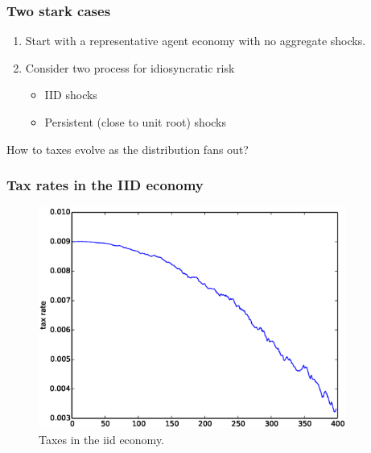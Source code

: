 \documentclass{beamer}
\begin{document}
\begin{frame}
 \frametitle{Two stark cases}
\begin{enumerate}
 \item Start with a representative agent economy with no aggregate shocks. 
\item 
 Consider two process for idiosyncratic risk
 
 \begin{itemize}
  \item IID shocks
  
  \item Persistent (close to unit root) shocks
 \end{itemize}

\end{enumerate}
 

How to taxes evolve as the distribution fans out?
 
\end{frame}

\begin{frame}
\frametitle {Tax rates in the IID economy}
  \begin{figure}[htp]
 \centering
 \includegraphics[width=0.9\textwidth]{Images/tax_iid.eps}
 \caption{Taxes in the iid economy.}
 \label{fig:taxes_iid}
 \end{figure}
\end{frame}
\end{document}
